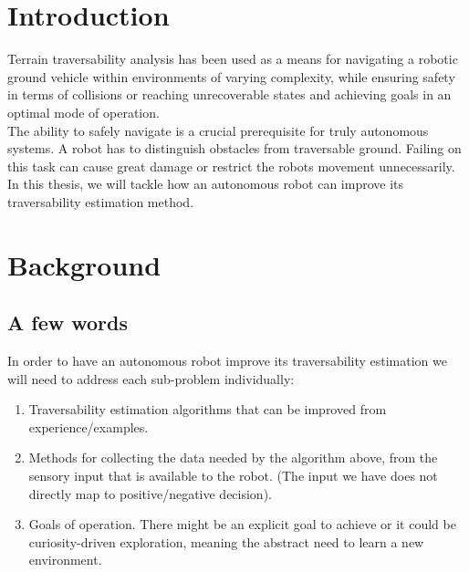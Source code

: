 \documentclass[12pt,a4paper]{report}
\begin{document}
	{
		\hypersetup{linkcolor=black}
		\tableofcontents
	}
	
	\chapter{Introduction}
	\label{sec:intro}
	
	Terrain traversability analysis has been used as a means for navigating 
	a robotic ground vehicle within environments of varying complexity, while 
	ensuring safety in terms of collisions or reaching unrecoverable states and 
	achieving goals in an optimal mode of operation.
	\\
	
	The ability to safely navigate is a crucial prerequisite for truly 
	autonomous systems. A robot has to distinguish obstacles from traversable 
	ground. Failing on this	task can cause great damage or restrict the robots 
	movement unnecessarily.
	\\
	
	In this thesis, we will tackle how an autonomous robot can improve its 
	traversability estimation method.
	
	\chapter{Background}
	\label{sec:bg}
	
	\section{A few words}
	\label{sec:bg:intro}
	
	In order to have an autonomous robot improve its traversability 
	estimation we will need to address each sub-problem individually:
	
	\begin{enumerate}
		\item Traversability estimation algorithms that can be improved from 
		experience/examples.
		\item Methods for collecting the data needed by the algorithm above, from 
		the sensory input that is available to the robot. (The input we have does not 
		directly map to positive/negative decision).
		\item Goals of operation. There might be an explicit goal to achieve or it 
		could be curiosity-driven exploration, meaning the abstract need to learn a 
		new environment.
	\end{enumerate}
	
\end{document}

